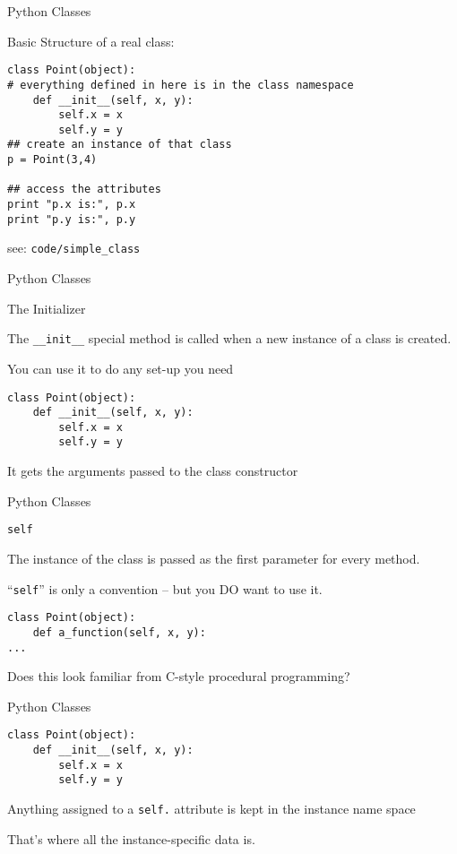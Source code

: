 \documentclass{beamer}
\begin{document}
\begin{frame}[fragile]{Python Classes}

{\Large Basic Structure of a real class:}

\begin{verbatim}
class Point(object):
# everything defined in here is in the class namespace
    def __init__(self, x, y):
        self.x = x
        self.y = y
## create an instance of that class        
p = Point(3,4)

## access the attributes
print "p.x is:", p.x
print "p.y is:", p.y
\end{verbatim}

{\large see: \verb|code/simple_class| }

\end{frame} 


\begin{frame}[fragile]{Python Classes}

{\LARGE The Initializer}

\vfill
{\Large The \verb|__init__| special method is called when a new instance of a class is created.}

\vfill
{\Large You can use it to do any set-up you need}

\vfill
\begin{verbatim}
class Point(object):
    def __init__(self, x, y):
        self.x = x
        self.y = y
\end{verbatim}
\vfill
{\Large It gets the arguments passed to the class constructor}
\end{frame} 

\begin{frame}[fragile]{Python Classes}

{\LARGE \verb|self|}

\vfill
{\Large The instance of the class is passed as the first parameter for every method.}

\vfill
{\Large ``\verb|self|'' is only a convention -- but you DO want to use it.}

\vfill
\begin{verbatim}
class Point(object):
    def a_function(self, x, y):
...
\end{verbatim}
\vfill
{\Large Does this look familiar from C-style procedural programming?}
\end{frame} 


\begin{frame}[fragile]{Python Classes}

\begin{verbatim}
class Point(object):
    def __init__(self, x, y):
        self.x = x
        self.y = y
\end{verbatim}

\vfill
{\Large Anything assigned to a \verb|self.| attribute is kept in the instance
name space}

\vfill
{\Large That's where all the instance-specific data is.}

\vfill
\end{frame} 
\end{document}
